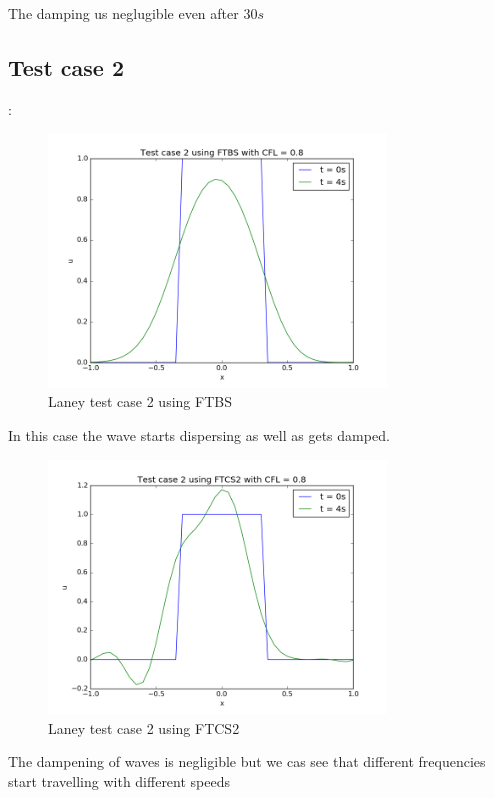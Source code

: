 \documentclass[11pt, a4paper]{article}
\begin{document}
The damping us neglugible even after $30s$

\subsection{Test case 2}:
\begin{figure}
 \centering
 \includegraphics[width = 0.8\textwidth]{laney_t2_bs_1.png}
 \caption{Laney test case 2 using FTBS}
\end{figure}
In this case the wave starts dispersing as well as gets damped. 

\begin{figure}
 \centering
 \includegraphics[width = 0.8\textwidth]{laney_t2_cs2_1.png}
 \caption{Laney test case 2 using FTCS2}
\end{figure}

The dampening of waves is negligible but we cas see that different frequencies start travelling with different speeds
\end{document}

